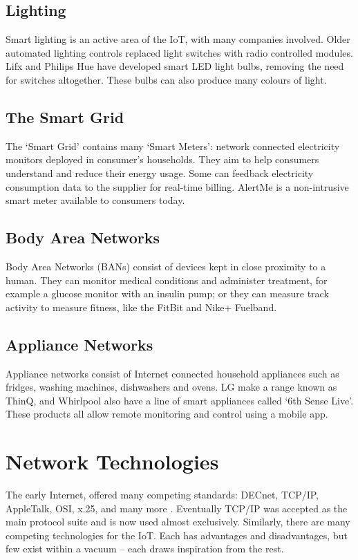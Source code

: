 \documentclass[10pt,journal,compsoc]{IEEEtran}
\begin{document}
\subsection{Lighting}
Smart lighting is an active area of the IoT, with many companies involved.
Older automated lighting controls replaced light switches with radio controlled
modules.  Lifx and Philips Hue have developed smart LED light bulbs, removing
the need for switches altogether. These bulbs can also produce many colours of
light. 

\subsection{The Smart Grid}
The `Smart Grid' contains many `Smart Meters': network connected electricity
monitors deployed in consumer's households. They aim to help consumers understand
and reduce their energy usage.  Some can feedback electricity consumption data
to the supplier for real-time billing. AlertMe is a non-intrusive smart meter
available to consumers today. 

\subsection{Body Area Networks}
Body Area Networks (BANs) consist of devices kept in close proximity to a
human. They can monitor medical conditions and administer treatment, for
example a glucose monitor with an insulin pump; or they can measure track
activity to measure fitness, like the FitBit and Nike+ Fuelband. 

\subsection{Appliance Networks} 
Appliance networks consist of Internet connected household appliances such as
fridges, washing machines, dishwashers and ovens.  LG make a range known as
ThinQ, and Whirlpool also have a line of smart appliances called `6th Sense
Live'. These products all allow remote monitoring and control using a mobile
app.


\section{Network Technologies}
The early Internet, offered many competing standards: DECnet, TCP/IP,
AppleTalk, OSI, x.25, and many more \cite{Cerf1993}. Eventually TCP/IP was
accepted as the main protocol suite and is now used almost exclusively.
Similarly, there are many competing technologies for the IoT. Each has
advantages and disadvantages, but few exist within a vacuum -- each draws
inspiration from the rest. 
\end{document}
